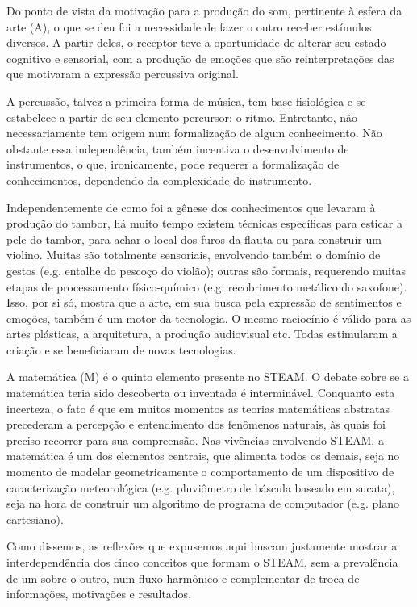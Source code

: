 Do ponto de vista da motivação para a produção do som, pertinente à esfera da arte (A), o que se deu foi a necessidade de fazer o outro receber estímulos diversos. A partir deles, o receptor teve a oportunidade de alterar seu estado cognitivo e sensorial, com a produção de emoções que são reinterpretações das que motivaram a expressão percussiva original.

A percussão, talvez a primeira forma de música, tem base fisiológica e se estabelece a partir de seu elemento percursor: o ritmo. Entretanto, não necessariamente tem origem num formalização de algum conhecimento. Não obstante essa independência, também incentiva o desenvolvimento de instrumentos, o que, ironicamente, pode requerer a formalização de conhecimentos, dependendo da complexidade do instrumento.

Independentemente de como foi a gênese dos conhecimentos que levaram à produção do tambor, há muito tempo existem técnicas específicas para esticar a pele do tambor, para achar o local dos furos da flauta ou para construir um violino. Muitas são totalmente sensoriais, envolvendo também o domínio de gestos (e.g. entalhe do pescoço do violão); outras são formais, requerendo muitas etapas de processamento físico-químico (e.g. recobrimento metálico do saxofone). Isso, por si só, mostra que a arte, em sua busca pela expressão de sentimentos e emoções, também é um motor da tecnologia. O mesmo raciocínio é válido para as artes plásticas, a arquitetura, a produção audiovisual etc. Todas estimularam a criação e se beneficiaram de novas tecnologias.

A matemática (M) é o quinto elemento presente no STEAM. O debate sobre se a matemática teria sido descoberta ou inventada é interminável. Conquanto esta incerteza, o fato é que em muitos momentos as teorias matemáticas abstratas precederam a percepção e entendimento dos fenômenos naturais, às quais foi preciso recorrer para sua compreensão. Nas vivências envolvendo STEAM, a matemática é um dos elementos centrais, que alimenta todos os demais, seja no momento de modelar geometricamente o comportamento de um dispositivo de caracterização meteorológica (e.g. pluviômetro de báscula baseado em sucata), seja na hora de construir um algoritmo de programa de computador (e.g. plano cartesiano).

Como dissemos, as reflexões que expusemos aqui buscam justamente mostrar a interdependência dos cinco conceitos que formam o STEAM, sem a prevalência de um sobre o outro, num fluxo harmônico e complementar de troca de informações, motivações e resultados.


